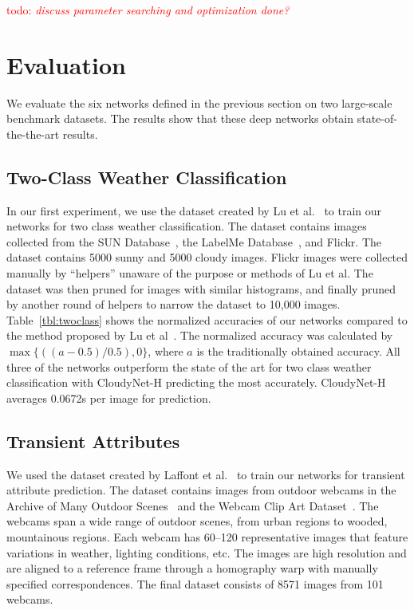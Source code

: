 \documentclass[10pt,twocolumn,letterpaper]{article}
\newcommand{\todo}[1]{\textcolor{red}{todo: {\em #1}}}
\newcommand{\tblref}[1]{Table~\ref{tbl:#1}}
\begin{document}
\todo{discuss parameter searching and optimization done?}

\section{Evaluation}
\indent
We evaluate the six networks defined in the previous section on two large-scale
benchmark datasets. The results show that these deep networks obtain
state-of-the-the-art results. 

\subsection{Two-Class Weather Classification}
\indent
In our first experiment, we use the dataset created by Lu et
al.~\cite{lutwoclass} to train our networks for two class weather
classification.  The dataset contains images collected from the SUN
Database~\cite{xiaoSUN}, the LabelMe Database~\cite{russell2008labelme}, and
Flickr. The dataset contains 5000 sunny and 5000 cloudy images. Flickr images
were collected manually by ``helpers'' unaware of the purpose or methods of Lu
et al. The dataset was then pruned for images with similar histograms, and
finally pruned by another round of helpers to narrow the dataset to 10,000
images.  \tblref{twoclass} shows the normalized accuracies of our networks
compared to the method proposed by Lu et al~\cite{lutwoclass}.  The normalized
accuracy was calculated by $ \max\{((a - 0.5) / 0.5), 0\} $, where $a$ is the
traditionally obtained accuracy. All three of the networks outperform the state
of the art for two class weather classification with CloudyNet-H predicting the
most accurately.  CloudyNet-H averages 0.0672s per image for prediction. 

\subsection{Transient Attributes}
\indent
We used the dataset created by Laffont et al.~\cite{Laffont14} to train our
networks for transient attribute prediction. The dataset contains images from
outdoor webcams in the Archive of Many Outdoor Scenes~\cite{jacobs07amos} and
the Webcam Clip Art Dataset~\cite{lalondesig09}.  The webcams span a wide range
of outdoor scenes, from urban regions to wooded, mountainous regions. Each
webcam has 60--120 representative images that feature variations in weather,
lighting conditions, etc.  The images are high resolution and are aligned to a
reference frame through a homography warp with manually specified
correspondences.  The final dataset consists of 8571 images from 101 webcams.
\end{document}
